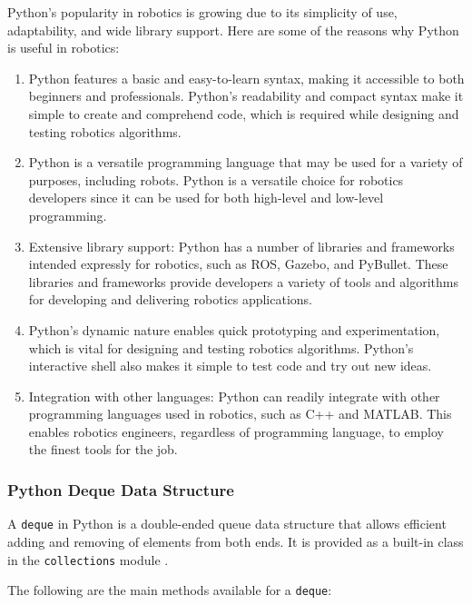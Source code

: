 \documentclass[12pt,oneside]{article}
\begin{document}
Python's popularity in robotics is growing due to its simplicity of use, adaptability, and wide library support. Here are some of the reasons why Python is useful in robotics:
\begin{enumerate}
\item Python features a basic and easy-to-learn syntax, making it accessible to both beginners and professionals. Python's readability and compact syntax make it simple to create and comprehend code, which is required while designing and testing robotics algorithms.
\item Python is a versatile programming language that may be used for a variety of purposes, including robots. Python is a versatile choice for robotics developers since it can be used for both high-level and low-level programming.
\item Extensive library support: Python has a number of libraries and frameworks intended expressly for robotics, such as ROS, Gazebo, and PyBullet. These libraries and frameworks provide developers a variety of tools and algorithms for developing and delivering robotics applications.
\item Python's dynamic nature enables quick prototyping and experimentation, which is vital for designing and testing robotics algorithms. Python's interactive shell also makes it simple to test code and try out new ideas.
\item Integration with other languages: Python can readily integrate with other programming languages used in robotics, such as C++ and MATLAB. This enables robotics engineers, regardless of programming language, to employ the finest tools for the job.
\end{enumerate}

\subsubsection{Python Deque Data Structure}{\label{python:deque}}
A \texttt{deque} in Python is a double-ended queue data structure that allows efficient adding and removing of elements from both ends. It is provided as a built-in class in the \texttt{collections} module \cite{python-docs}.

The following are the main methods available for a \texttt{deque}:
\end{document}
